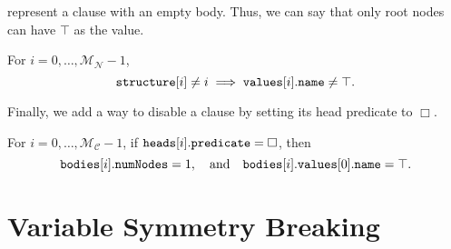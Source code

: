 \documentclass[runningheads]{llncs}
\newcommand{\variable}[1]{\texttt{\textup{#1}}}
\newcommand{\maxNumNodes}{\mathcal{M}_{\mathcal{N}}}
\newcommand{\maxNumClauses}{\mathcal{M}_{\mathcal{C}}}
\begin{document}
represent a clause with an empty body. Thus, we can say that only root nodes can
have $\top$ as the value.
\begin{constraint}
  For $i = 0, \dots, \maxNumNodes{} - 1$,
  \[
    \variable{structure}[i] \ne i \implies
    \variable{values}[i].\variable{name} \ne \top.
  \]
\end{constraint}
Finally, we add a way to disable a clause by setting its head predicate to
$\Box$.
\begin{constraint}
  For $i = 0, \dots, \maxNumClauses{} - 1$, if
  $\variable{heads}[i].\variable{predicate} = \Box$, then
  \[
    \variable{bodies}[i].\variable{numNodes} = 1, \quad \text{and}
    \quad \variable{bodies}[i].\variable{values}[0].\variable{name} = \top.
  \]
\end{constraint}

\section{Variable Symmetry Breaking} \label{sec:variable_symmetry}
\end{document}
